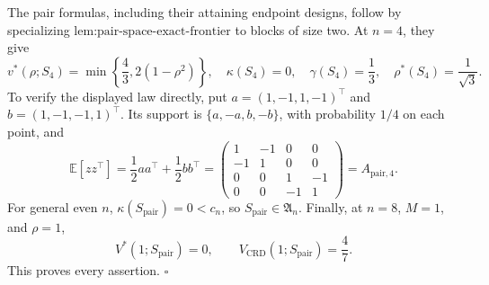 The pair formulas, including their attaining endpoint designs, follow by specializing \(\text{lem:pair-space-exact-frontier}\) to blocks of size two. At \(n=4\), they give
\[
v^*(\rho;S_4)=\min\left\{\frac43,2(1-\rho^2)\right\},
\quad
\kappa(S_4)=0,
\quad
\gamma(S_4)=\frac13,
\quad
\rho^*(S_4)=\frac1{\sqrt3}.
\tag{14}
\]
To verify the displayed law directly, put \(a=(1,-1,1,-1)^\top\) and \(b=(1,-1,-1,1)^\top\). Its support is \(\{a,-a,b,-b\}\), with probability \(1/4\) on each point, and
\[
\mathbb E[zz^\top]
=\frac12aa^\top+\frac12bb^\top
=\begin{pmatrix}
1&-1&0&0\\
-1&1&0&0\\
0&0&1&-1\\
0&0&-1&1
\end{pmatrix}
=A_{\mathrm{pair},4}.
\tag{15}
\]
For general even \(n\), \(\kappa(S_{\mathrm{pair}})=0<c_n\), so \(S_{\mathrm{pair}}\in\mathfrak A_n\). Finally, at \(n=8\), \(M=1\), and \(\rho=1\),
\[
V^*(1;S_{\mathrm{pair}})=0,
\qquad
V_{\mathrm{CRD}}(1;S_{\mathrm{pair}})=\frac47.
\]
This proves every assertion. \(\square\)